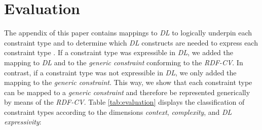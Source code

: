 \documentclass[a4paper,fontsize=11pt]{scrartcl}
\begin{document}
\section{Evaluation}
\label{sec:evaluation}

The appendix of this paper contains mappings to \emph{DL} to logically underpin each constraint type and to determine which \emph{DL} constructs are needed to express each constraint type \cite{BoschNolleAcarEckert2015}.
If a constraint type was expressible in \emph{DL}, we added the mapping to \emph{DL} and to the \emph{generic constraint} conforming to the \emph{RDF-CV}.
In contrast, if a constraint type was not expressible in \emph{DL}, we only added the mapping to the \emph{generic constraint}.
This way, we show that each constraint type can be mapped to a \emph{generic constraint} and therefore be represented generically by means of the \emph{RDF-CV}.
Table \ref{tab:evaluation} displays the classification of constraint types according to the dimensions \emph{context}, \emph{complexity}, and \emph{DL expressivity}:

\end{document}
